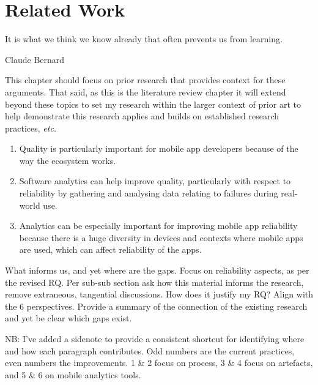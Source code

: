 \setchapterpreamble[u]{\margintoc}
\chapter{Related Work}
\label{chapter-related-work}
\epigraph{It is what we think we know already that often prevents us from learning.}{Claude Bernard} %

\bigskip
\bigskip %

\begin{kaobox}[frametitle=Context for this chapter (to be removed pre-submission)]
This chapter should focus on prior research that provides context for these arguments. That said, as this is the literature review chapter it will extend beyond these topics to set my research within the larger context of prior art to help demonstrate this research applies and builds on established research practices, \emph{etc.}

\begin{enumerate}[start=3]
    \item Quality is particularly important for mobile app developers because of the way the ecosystem works.
    \item Software analytics can help improve quality, particularly with respect to reliability by gathering and analysing data relating to failures during real-world use.
    \item Analytics can be especially important for improving mobile app reliability because there is a huge diversity in devices and contexts where mobile apps are used, which can affect reliability of the apps.
\end{enumerate}

What informs us, and yet where are the gaps. Focus on reliability aspects, as per the revised RQ. Per sub-sub section ask how this material informs the research, remove extraneous, tangential discussions. How does it justify my RQ? Align with the 6 perspectives. Provide a summary of the connection of the existing research and yet be clear which gaps exist. 

NB: I've added a sidenote to provide a consistent shortcut for identifying where and how each paragraph contributes. Odd numbers are the current practices, even numbers the improvements. 1 \& 2 focus on process, 3 \& 4 focus on artefacts, and 5 \& 6 on mobile analytics tools.

\end{kaobox}


